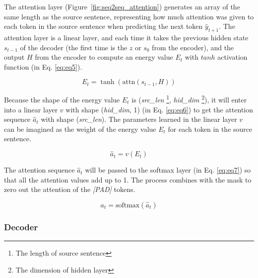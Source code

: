 The attention layer (Figure~\ref{fig:seq2seq_attention}) generates an array of the same length as the source sentence, representing how much attention was given to each token in the source sentence when predicting the next token $\hat{y}_{t+1}$. The attention layer is a linear layer, and each time it takes the previous hidden state $s_{t-1}$ of the decoder (the first time is the $z$ or $s_0$ from the encoder), and the output $H$ from the encoder to compute an energy value $E_t$ with $tanh$ activation function (in Eq. \ref{eq:eq5}).

\begin{equation}
    E_t = \tanh(\text{attn}(s_{t-1}, H)) \label{eq:eq5}
\end{equation}

Because the shape of the energy value $E_t$ is (\textit{src\_len} \footnote{The length of source sentence}, \textit{hid\_dim} \footnote{The dimension of hidden layer}), it will enter into a linear layer $v$ with shape (\textit{hid\_dim}, 1) (in Eq. \ref{eq:eq6}) to get the attention sequence $\hat{a}_t$ with shape (\textit{src\_len}). The parameters learned in the linear layer $v$ can be imagined as the weight of the energy value $E_t$ for each token in the source sentence.

\begin{equation}
     \hat{a}_t = v(E_t) \label{eq:eq6}
\end{equation}

The attention sequence $\hat{a}_t$ will be passed to the softmax layer (in Eq. \ref{eq:eq7}) so that all the attention values add up to 1. The process combines with the mask to zero out the attention of the \textit{[PAD]} tokens. 

\begin{equation}
a_t = \text{softmax}(\hat{a}_t) \label{eq:eq7}
\end{equation}

\subsubsection{Decoder}

